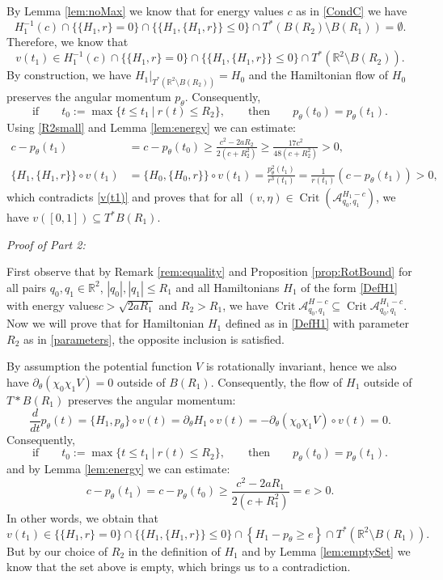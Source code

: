 \documentclass[a4paper]{amsart}
\numberwithin{equation}{section}
\newcommand{\R}{\mathbb{R}}
\newcommand{\A}{\mathcal{A}}
\newcommand{\Crit}{\operatorname{Crit}}
\begin{document}
By Lemma \ref{lem:noMax} we know that for energy values $c$ as in \eqref{CondC} we have
$$
H_1^{-1}(c)\cap\{\{H_1,r\}=0\}\cap \{\{H_1,\{H_1,r\}\}\leq 0\}\cap T^*(B(R_2)\setminus B(R_1))=\emptyset.
$$
Therefore, we know that
$$
v(t_1)\in H_1^{-1}(c)\cap\{\{H_1,r\}=0\}\cap \{\{H_1,\{H_1,r\}\}\leq 0\}\cap T^*(\R^2\setminus B(R_2)).
$$
By construction, we have $H_1|_{T^*(\R^2\setminus B(R_2))}=H_0$ and the Hamiltonian flow of $H_0$ preserves the angular momentum $p_\theta$. Consequently, 
$$
\textrm{if}\qquad t_0:= \max\{ t \leq t_1\ |\ r(t) \leq R_2\},\qquad\textrm{then}\qquad p_\theta(t_0)=p_\theta(t_1).
$$
Using \eqref{R2small} and Lemma \ref{lem:energy} we can estimate:
\begin{align*}
c-p_\theta(t_1)&=c-p_\theta(t_0)\geq \frac{c^2-2aR_2}{2(c+R_2^2)}\geq \frac{17c^2}{48(c+R_2^2)}>0,\\
\{H_1, \{H_1, r\}\}\circ v(t_1) & = \{H_0, \{H_0, r\}\}\circ v(t_1)=\frac{p_\theta^2(t_1)}{r^3(t_1)}=\frac{1}{r(t_1)}\left( c-p_\theta(t_1)\right)>0,
\end{align*}
which contradicts \eqref{v(t1)} and proves that for all $(v,\eta) \in \Crit (\A^{H_1-c}_{q_0,q_1})$, we have $v([0,1]) \subseteq T^*B(R_1)$.

\noindent\textit{Proof of Part 2:}

First observe that by Remark \ref{rem:equality} and Proposition \ref{prop:RotBound} for all pairs $q_0, q_1\in \R^2$, $|q_0|, |q_1|\leq R_1$ and all Hamiltonians $H_1$ of the form \eqref{DefH1} with energy values\linebreak $c> \sqrt{2aR_1}$ and $R_2>R_1$, 
we have $\Crit\A_{q_0,q_1}^{H-c}\subseteq \Crit\A_{q_0,q_1}^{H_1-c}$. Now we will prove that for Hamiltonian $H_1$ defined as in \eqref{DefH1} with parameter $R_2$ as in \eqref{parameters}, the opposite inclusion is satisfied.

By assumption the potential function $V$ is rotationally invariant, hence we also have $\partial_\theta(\chi_0\chi_1 V)=0$ outside of $B(R_1)$. Consequently, the flow of $H_1$ outside of $T*B(R_1)$ preserves the angular momentum:
$$
\frac{d}{dt}p_\theta(t)=\{H_1, p_\theta\}\circ v(t)= \partial_\theta H_1 \circ v(t)= -\partial_\theta (\chi_0 \chi_1 V) \circ v(t)=0.
$$
Consequently, 
$$
\textrm{if}\qquad t_0:= \max\{ t \leq t_1\ |\ r(t) \leq R_2\},\qquad\textrm{then}\qquad p_\theta(t_0)=p_\theta(t_1).
$$
and by Lemma \ref{lem:energy} we can estimate:
$$
c-p_\theta(t_1)=c-p_\theta(t_0)\geq \frac{c^2-2aR_1}{2(c+R_1^2)}=e>0.
$$
In other words, we obtain that
$$
v(t_1)\in \{\{H_1,r\}=0\}\cap \{\{H_1,\{H_1,r\}\}\leq 0\}\cap \left\lbrace H_1-p_\theta \geq e\right\rbrace\cap T^*(\R^2\setminus B(R_1)).
$$
But by our choice of $R_2$ in the definition of $H_1$ and by Lemma \ref{lem:emptySet} we know that the set above is empty, which brings us to a contradiction.
\end{document}

